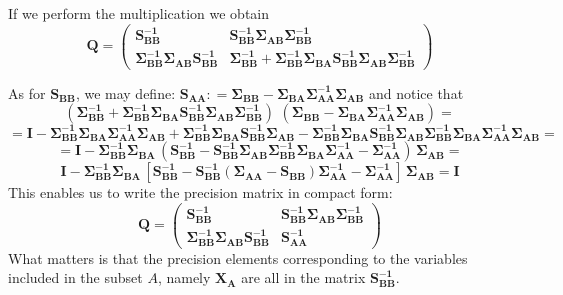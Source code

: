 \documentclass[openany]{book}
\begin{document}
If we perform the multiplication we obtain
$$
\mathbf{Q} = 
	\left( \begin{array}{ll} 
	\mathbf{S_{BB}^{-1}}   &
	\mathbf{S_{BB}^{-1}} \mathbf{\Sigma_{AB}} \mathbf{\Sigma_{BB}^{-1}}\\ 
	\mathbf{\Sigma_{BB}^{-1}} \mathbf{\Sigma_{AB}} \mathbf{S_{BB}^{-1}}& 
	\mathbf{\Sigma_{BB}^{-1}} + \mathbf{\Sigma_{BB}^{-1}} 
	\mathbf{\Sigma_{BA}} \mathbf{S_{BB}^{-1}}
    \mathbf{\Sigma_{AB}} \mathbf{\Sigma_{BB}^{-1}} 
\end{array} \right)
$$

As for $\mathbf{S_{BB}}$, we may define:
$\mathbf{S_{AA}} : =
\mathbf{\Sigma_{BB}} - \mathbf{\Sigma_{BA}} \mathbf{\Sigma^{-1}_{AA}} \mathbf{\Sigma_{AB}}$ and notice that
$$
\left(\mathbf{\Sigma_{BB}^{-1}} + \mathbf{\Sigma_{BB}^{-1}} \mathbf{\Sigma_{BA}} \mathbf{S_{BB}^{-1}}
\mathbf{\Sigma_{AB}} \mathbf{\Sigma_{BB}^{-1}} \right) \, \, 
\left(\mathbf{\Sigma_{BB}} - \mathbf{\Sigma_{BA}} \mathbf{\Sigma^{-1}_{AA}} \mathbf{\Sigma_{AB}} \right) =
$$
$$
= \mathbf{I} 
- \mathbf{\Sigma_{BB}^{-1}} \mathbf{\Sigma_{BA}} \mathbf{\Sigma_{AA}^{-1}} \mathbf{\Sigma_{AB}}
+ \mathbf{\Sigma_{BB}^{-1}} \mathbf{\Sigma_{BA}} \mathbf{S_{BB}^{-1}}
  \mathbf{\Sigma_{AB}} 
- \mathbf{\Sigma_{BB}^{-1}} \mathbf{\Sigma_{BA}}      \mathbf{S_{BB}^{-1}}
  \mathbf{\Sigma_{AB}}      \mathbf{\Sigma_{BB}^{-1}} \mathbf{\Sigma_{BA}}
  \mathbf{\Sigma^{-1}_{AA}} \mathbf{\Sigma_{AB}} = 
$$
$$
= \mathbf{I} - \mathbf{\Sigma_{BB}^{-1}} \mathbf{\Sigma_{BA}} \,
\left( \mathbf{S_{BB}^{-1}}  - \mathbf{S_{BB}^{-1}}  \mathbf{\Sigma_{AB}}      \mathbf{\Sigma_{BB}^{-1}} \mathbf{\Sigma_{BA}}
\mathbf{\Sigma^{-1}_{AA}} - \mathbf{\Sigma^{-1}_{AA}} \right) \,
\mathbf{\Sigma_{AB}} =
$$ 
$$
\mathbf{I} - \mathbf{\Sigma_{BB}^{-1}} \mathbf{\Sigma_{BA}} \,
\left[
\mathbf{S_{BB}^{-1}} - \mathbf{S_{BB}^{-1}} \left(\mathbf{\Sigma_{AA}} - \mathbf{S_{BB}} 
 \right)\mathbf{\Sigma^{-1}_{AA}} - \mathbf{\Sigma^{-1}_{AA}}
\right] \, \mathbf{\Sigma_{AB}} = \mathbf{I}
$$
This enables us to write the precision matrix in compact form:
\begin{equation}
\mathbf{Q} = 
\left( \begin{array}{ll} 
	\mathbf{S_{BB}^{-1}}   &
	\mathbf{S_{BB}^{-1}} \mathbf{\Sigma_{AB}} \mathbf{\Sigma_{BB}^{-1}}\\ 
	\mathbf{\Sigma_{BB}^{-1}} \mathbf{\Sigma_{AB}} \mathbf{S_{BB}^{-1}}& 
	\mathbf{S_{AA}^{-1}}  
\end{array} \right)
\end{equation}
What matters is that the precision elements corresponding to the variables included in the subset $A$, namely $\mathbf{X_A}$ are all in the matrix $\mathbf{S_{BB}^{-1}}$.
\end{document}
